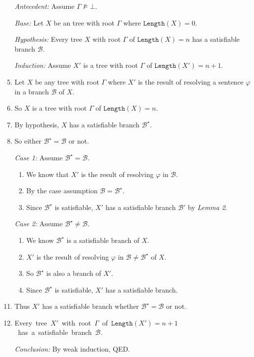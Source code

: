 \documentclass[a4paper, 11pt]{article} %
\newcommand{\B}{\mathcal{B}}
\newcommand{\leng}{\texttt{Length}}
\begin{document}
\begin{enumerate}
  \item[\it Antecedent:] Assume $\Gamma \nvDash \bot$.
  \item[\it Base:] Let $X$ be an tree with root $\Gamma$ where $\leng(X)=0$.
  \item[\it Hypothesis:] Every tree $X$ with root $\Gamma$ of $\leng(X)=n$ has a satisfiable branch $\B$.
  \item[\it Induction:] Assume $X'$ is a tree with root $\Gamma$ of $\leng(X')=n+1$.
  \item Let $X$ be any tree with root $\Gamma$ where $X'$ is the result of resolving a sentence $\varphi$ in a branch $\B$ of $X$. 
  \item So $X$ is a tree with root $\Gamma$ of $\leng(X)=n$.
  \item By hypothesis, $X$ has a satisfiable branch $\B^\star$.
  \item So either $\B^\star=\B$ or not. 
  \item[\it Case 1:] Assume $\B^\star=\B$.
    \begin{enumerate}
      \item We know that $X'$ is the result of resolving $\varphi$ in $\B$.
      \item By the case assumption $\B=\B^\star$.
      \item Since $\B^\star$ is satisfiable, $X'$ has a satisfiable branch $\B'$ by \textit{Lemma 2}. 
    \end{enumerate}
  \item[\it Case 2:] Assume $\B^\star\neq\B$.
    \begin{enumerate}
      \item We know $\B^\star$ is a satisfiable branch of $X$. 
      \item $X'$ is the result of resolving $\varphi$ in $\B\neq\B^\star$ of $X$.
      \item So $\B^\star$ is also a branch of $X'$.
      \item Since $\B^\star$ is satisfiable, $X'$ has a satisfiable branch. 
    \end{enumerate}
  \item Thus $X'$ has a satisfiable branch whether $\B^\star=\B$ or not.  
  \item \mbox{Every tree $X'$ with root $\Gamma$ of $\leng(X')=n+1$ has a satisfiable branch $\B$.} 
  \item[\it Conclusion:] By weak induction, QED.
\end{enumerate}
\end{document}
